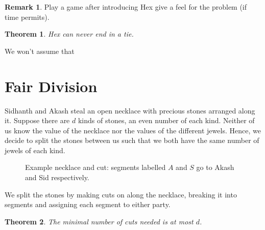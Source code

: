 \documentclass[12pt]{amsart}
\newtheorem{thm}{Theorem}[section]
\theoremstyle{definition}
\newtheorem*{rem}{Remark}
\begin{document}
    \begin{rem}
        Play a game after introducing Hex give a feel for the problem (if time permits). 
    \end{rem}

    \begin{thm}
        Hex can never end in a tie.
    \end{thm}

    We won't assume that



    \newpage

    \section{Fair Division}

    Sidhanth and Akash steal an open necklace with precious stones arranged along it. Suppose there are $d$ kinds of stones, an even number of each kind. Neither of us know the value of the necklace nor the values of the different jewels. Hence, we decide to split the stones between us such that we both have the same number of jewels of each kind. 
    
    \begin{figure}[h]
        \begin{tikzpicture}
            
        \end{tikzpicture}
        \caption{Example necklace and cut: segments labelled $A$ and $S$ go to Akash and Sid respectively.}
    \end{figure}

    We split the stones by making cuts on along the necklace, breaking it into segments and assigning each segment to either party.

    \begin{thm}
        The minimal number of cuts needed is at most $d$.
    \end{thm}

    


    \newpage


    
\end{document}
